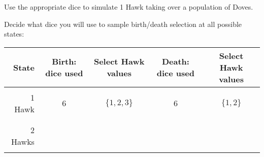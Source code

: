 \documentclass{article}
\begin{document}
\newpage
\section*{}

Use the appropriate dice to simulate 1 Hawk taking over a population of Doves.

Decide what dice you will use to sample birth/death selection at all possible
states:

\begin{center}
    \begin{tabular}{r|c|c|c|c}
        \toprule
        State & Birth: dice used & Select Hawk values   & Death: dice used &
        Select Hawk values \\
        \midrule
                        &   &                 &   & \\
        1 Hawk          & 6 & \(\{1, 2, 3\}\) & 6 & \(\{1, 2\}\) \\
                        &   &                 &   & \\
        \midrule
                        &   &                 &   & \\
        2 Hawks         &   &                 &   & \\
                        &   &                 &   & \\
        \bottomrule
    \end{tabular}
\end{center}


\subsection*{}
\end{document}
